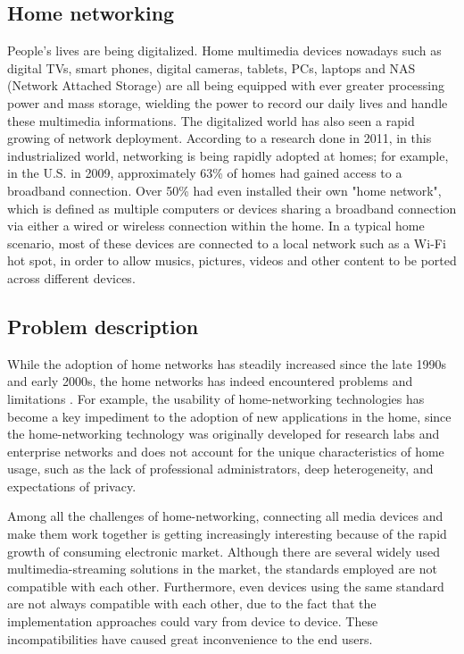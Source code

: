 
\subsection{Home networking}
People's lives are being digitalized. Home multimedia devices nowadays such as digital TVs,
smart phones, digital cameras, tablets, PCs, laptops and NAS (Network Attached
Storage) are all being equipped with ever greater processing power and mass storage, wielding the power  to
 record our daily lives and handle these multimedia informations. The digitalized world has also seen a rapid growing of network deployment. According to a research
\cite{stateofHN} done in 2011, in this industrialized world, networking
is being rapidly adopted at homes; for example, in the U.S. in 2009,
approximately 63\% of homes had gained access to a broadband connection. Over 50\% had even installed their own "home network", which is defined as multiple computers or devices sharing a broadband
 connection via either a wired or wireless connection within the home. In a typical
home scenario, most of these devices are connected to a local network such as a
Wi-Fi hot spot, in order to allow musics, pictures, videos and other content to
be ported across different devices.

\subsection{Problem description}
While the adoption of home networks has steadily increased since the late 1990s
and early 2000s, the home networks has indeed encountered problems and limitations
\cite{stateofHN}. For example, the usability of home-networking technologies has become
a key impediment to the adoption of new applications in the home, since the home-networking technology was originally developed for
 research labs and enterprise networks and does not account for the unique
 characteristics of home usage, such as the lack of professional administrators, deep
heterogeneity, and expectations of privacy.

Among all the challenges of home-networking, connecting all media devices and make them work together is getting increasingly interesting because of the rapid growth of consuming electronic market. Although there are
 several widely used multimedia-streaming solutions in the market, the 
standards employed are not compatible with each other. Furthermore, even devices using
the same standard are not always compatible with each other, due to the fact that the implementation approaches could vary from device to device. These incompatibilities have caused great inconvenience to the end users. 


